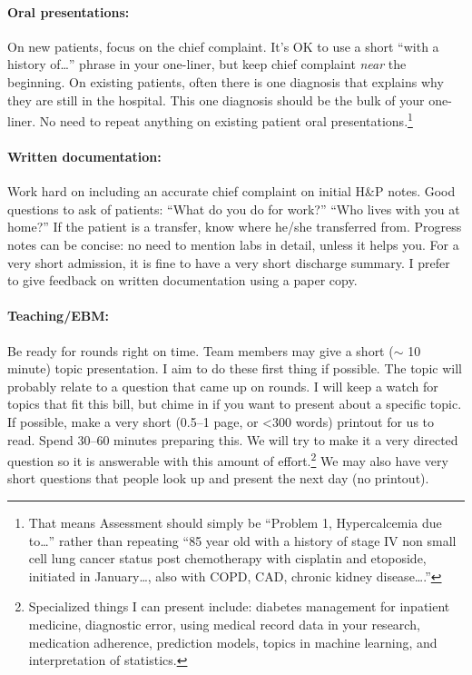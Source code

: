 \documentclass{tufte-handout}
\begin{document}
\paragraph{Oral presentations:} On new patients, focus on the chief
complaint. It's OK to use a short ``with a history of\ldots{}'' phrase
in your one-liner, but keep chief complaint \emph{near} the beginning. On existing patients, often there is one diagnosis
that explains why they are still in the hospital. This one diagnosis
should be the bulk of your one-liner. No need to repeat anything on
existing patient oral presentations.\footnote{That means Assessment
should simply be ``Problem 1, Hypercalcemia due to\ldots{}'' rather
than repeating ``85 year old with a history of stage IV non small cell
lung cancer status post chemotherapy with cisplatin and etoposide,
initiated in January\ldots{}, also with COPD, CAD, chronic kidney
disease\ldots{}.''}

\paragraph{Written documentation:} Work hard on including an accurate chief
complaint on initial H\&P notes. Good questions to ask of
patients: ``What do you do for work?'' ``Who lives with you at home?''
If the patient is a transfer, know where he/she transferred
from. Progress notes can be concise: no need to mention
labs in detail, unless it helps you.
For a very short admission, it is fine to
have a very short discharge summary.
I prefer to give feedback on written documentation using a paper copy.

\paragraph{Teaching/EBM:} Be ready for rounds right on time.
Team members may give a short ($\sim$ 10 minute) topic presentation. I
aim to do these first thing if possible. The topic will probably
relate to a question that came up on rounds. I will keep a watch for
topics that fit this bill, but chime in if you want to present about a
specific topic. If possible, make a very short (0.5--1 page, or <300
words) printout for us to read. Spend 30--60 minutes preparing this.
We will try to make it a very directed question so it is answerable
with this amount of effort.\footnote{Specialized things I can present
include: diabetes management for inpatient medicine, diagnostic error,
using medical record data in your research, medication adherence,
prediction models, topics in machine learning, and interpretation of
statistics.} We may also have very short questions that people look up
and present the next day (no printout).
\end{document}

